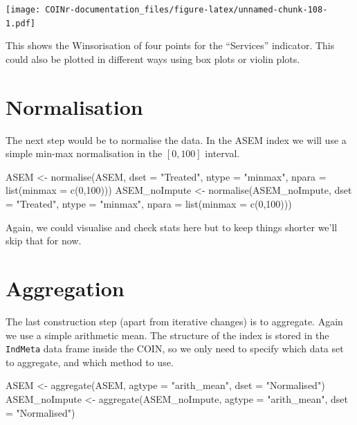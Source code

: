 \documentclass[
]{book}
\newenvironment{Shaded}{\begin{snugshade}}{\end{snugshade}}
\newcommand{\AttributeTok}[1]{\textcolor[rgb]{0.77,0.63,0.00}{#1}}
\newcommand{\DecValTok}[1]{\textcolor[rgb]{0.00,0.00,0.81}{#1}}
\newcommand{\FunctionTok}[1]{\textcolor[rgb]{0.00,0.00,0.00}{#1}}
\newcommand{\NormalTok}[1]{#1}
\newcommand{\OtherTok}[1]{\textcolor[rgb]{0.56,0.35,0.01}{#1}}
\newcommand{\StringTok}[1]{\textcolor[rgb]{0.31,0.60,0.02}{#1}}
\begin{document}
\texttt{[image: COINr-documentation\_files/figure-latex/unnamed-chunk-108-1.pdf]}

This shows the Winsorisation of four points for the ``Services'' indicator. This could also be plotted in different ways using box plots or violin plots.

\hypertarget{normalisation-1}{%
\section{Normalisation}\label{normalisation-1}}

The next step would be to normalise the data. In the ASEM index we will use a simple min-max normalisation in the \([0, 100]\) interval.

\begin{Shaded}
\begin{Highlighting}[]
\NormalTok{ASEM }\OtherTok{\textless{}{-}} \FunctionTok{normalise}\NormalTok{(ASEM, }\AttributeTok{dset =} \StringTok{"Treated"}\NormalTok{, }\AttributeTok{ntype =} \StringTok{"minmax"}\NormalTok{, }\AttributeTok{npara =} \FunctionTok{list}\NormalTok{(}\AttributeTok{minmax =} \FunctionTok{c}\NormalTok{(}\DecValTok{0}\NormalTok{,}\DecValTok{100}\NormalTok{)))}
\NormalTok{ASEM\_noImpute }\OtherTok{\textless{}{-}} \FunctionTok{normalise}\NormalTok{(ASEM\_noImpute, }\AttributeTok{dset =} \StringTok{"Treated"}\NormalTok{, }\AttributeTok{ntype =} \StringTok{"minmax"}\NormalTok{, }\AttributeTok{npara =} \FunctionTok{list}\NormalTok{(}\AttributeTok{minmax =} \FunctionTok{c}\NormalTok{(}\DecValTok{0}\NormalTok{,}\DecValTok{100}\NormalTok{)))}
\end{Highlighting}
\end{Shaded}

Again, we could visualise and check stats here but to keep things shorter we'll skip that for now.

\hypertarget{aggregation-1}{%
\section{Aggregation}\label{aggregation-1}}

The last construction step (apart from iterative changes) is to aggregate. Again we use a simple arithmetic mean. The structure of the index is stored in the \texttt{IndMeta} data frame inside the COIN, so we only need to specify which data set to aggregate, and which method to use.

\begin{Shaded}
\begin{Highlighting}[]
\NormalTok{ASEM }\OtherTok{\textless{}{-}} \FunctionTok{aggregate}\NormalTok{(ASEM, }\AttributeTok{agtype =} \StringTok{"arith\_mean"}\NormalTok{, }\AttributeTok{dset =} \StringTok{"Normalised"}\NormalTok{)}
\NormalTok{ASEM\_noImpute }\OtherTok{\textless{}{-}} \FunctionTok{aggregate}\NormalTok{(ASEM\_noImpute, }\AttributeTok{agtype =} \StringTok{"arith\_mean"}\NormalTok{, }\AttributeTok{dset =} \StringTok{"Normalised"}\NormalTok{)}
\end{Highlighting}
\end{Shaded}
\end{document}
